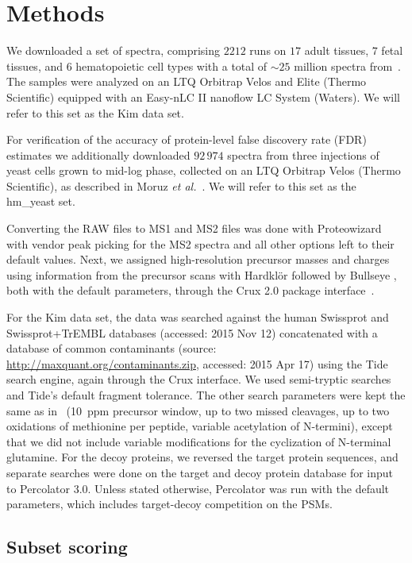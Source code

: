 \documentclass{article}
\begin{document}
\section*{Methods}

We downloaded a set of spectra, comprising $2212$ runs on $17$ adult
tissues, $7$ fetal tissues, and $6$ hematopoietic cell types with a
total of $\sim 25$ million spectra from~\cite{kim2014draft}. The
samples were analyzed on an LTQ Orbitrap Velos and Elite (Thermo
Scientific) equipped with an Easy-nLC II nanoflow LC System
(Waters). We will refer to this set as the Kim data set.

For verification of the accuracy of protein-level false discovery rate 
(FDR) estimates we additionally downloaded $92\,974$ spectra from 
three injections of yeast cells grown to mid-log phase, collected on 
an LTQ Orbitrap Velos (Thermo Scientific), as described in Moruz {\em 
et al.}~\cite{moruz2013}.  We will refer to this set as the hm\_yeast 
set.

Converting the RAW files to MS1 and MS2 files was done with
Proteowizard~\cite{kessner2008} with vendor peak picking for the MS2
spectra and all other options left to their default values.  Next, we
assigned high-resolution precursor masses and charges using
information from the precursor scans with Hardkl\"{o}r
\cite{hoopmann2007} followed by Bullseye \cite{hsieh2009}, both with
the default parameters, through the Crux 2.0 package
interface~\cite{mcilwain2014}.

For the Kim data set, the data was searched against the human
Swissprot and Swissprot+TrEMBL databases (accessed: 2015 Nov 12)
concatenated with a database of common contaminants (source:
\url{http://maxquant.org/contaminants.zip}, accessed: 2015 Apr 17)
using the Tide search engine, again through the Crux interface. We
used semi-tryptic searches and Tide's default fragment tolerance. The
other search parameters were kept the same as in~\cite{kim2014draft}
(10~ppm precursor window, up to two missed cleavages, up to two
oxidations of methionine per peptide, variable acetylation of
N-termini), except that we did not include variable modifications for
the cyclization of N-terminal glutamine.  For the decoy proteins, we
reversed the target protein sequences, and separate searches were done
on the target and decoy protein database for input to Percolator
3.0. Unless stated otherwise, Percolator was run with the default
parameters, which includes target-decoy competition on the PSMs.

\subsection*{Subset scoring}
\end{document}
